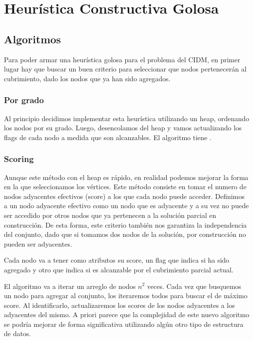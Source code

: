 \section{Heurística Constructiva Golosa}

\subsection{Algoritmos}

Para poder armar una heurística golosa para el problema del CIDM, en primer lugar hay que buscar un buen criterio para seleccionar que nodos pertenecerán al cubrimiento, dado los nodos que ya han sido agregados.

\subsubsection{Por grado}

Al principio decidimos implementar esta heurística utilizando un heap, ordenando los nodos por su grado. Luego, desencolamos del heap y vamos actualizando los flags de cada nodo a medida que son alcanzables. El algoritmo tiene .

\subsubsection{Scoring}

Aunque este método con el heap es rápido, en realidad podemos mejorar la forma en la que seleccionamos los vértices. Este método consiste en tomar el numero de nodos adyacentes efectivos (score) a los que cada nodo puede acceder. Definimos a un nodo adyacente efectivo como un nodo que es adyacente y a su vez no puede ser accedido por otros nodos que ya pertenecen a la solución parcial en construcción. De esta forma, este criterio también nos garantiza la independencia del conjunto, dado que si tomamos dos nodos de la solución, por construcción no pueden ser adyacentes.

Cada nodo va a tener como atributos su score, un flag que indica si ha sido agregado y otro que indica si es alcanzable por el cubrimiento parcial actual.

El algoritmo va a iterar un arreglo de nodos $n^2$ veces. Cada vez que busquemos un nodo para agregar al conjunto, los iteraremos todos para buscar el de máximo score. Al identificarlo, actualizaremos los scores de los nodos adyacentes a los adyacentes del mismo. A priori parece que la complejidad de este nuevo algoritmo se podría mejorar de forma significativa utilizando algún otro tipo de estructura de datos.

